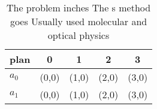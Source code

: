 \documentclass[a4paper]{article}
\begin{document}
\begin{table}
\begin{adjustbox}{width=0.5\columnwidth}
\begin{tabular}{|l|l|l|l|l|}
\hline
\textbf{plan} & \multicolumn{1}{c|}{\textbf{0}} & \multicolumn{1}{c|}{\textbf{1}} & \multicolumn{1}{c|}{\textbf{2}} & \multicolumn{1}{c|}{\textbf{3}} \\ \hline
\textbf{$a_0$}  & (0,0) & (1,0) & (2,0) & (3,0) \\ \hline
\textbf{$a_1$}  & (0,0) & (1,0) & (2,0) & (3,0) \\ \hline
\end{tabular}
\end{adjustbox}
\caption{The problem inches The s method goes Usually used molecular and optical physics
}
\end{table}
\end{document}
